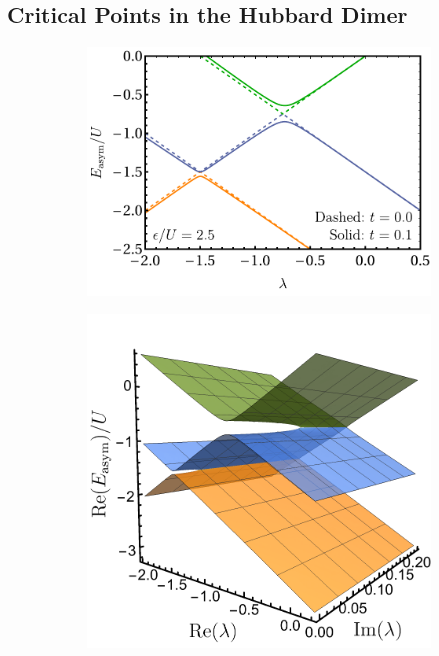 \documentclass[aps,prb,reprint,noshowkeys,superscriptaddress]{revtex4-1}
\begin{document}
\subsection{Critical Points in the Hubbard Dimer}
\label{sec:critical_point_hubbard}

\begin{figure}[t]
	\begin{subfigure}{0.32\textwidth}
	\includegraphics[height=0.75\textwidth]{fig7a}	
		\subcaption{\label{subfig:rmp_cp}}
    \end{subfigure}
    \begin{subfigure}{0.32\textwidth}
	\includegraphics[height=0.75\textwidth]{fig7b}

\end{subfigure}
\end{figure}
\end{document}
